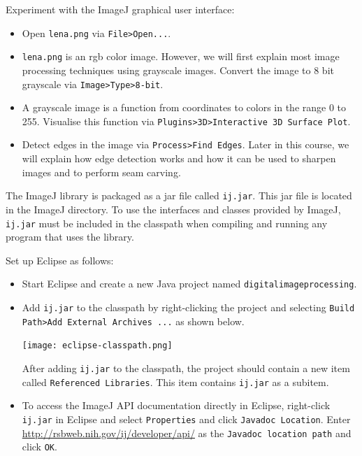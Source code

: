 \documentclass{book}
\begin{document}
\begin{exercise}
Experiment with the ImageJ graphical user interface:
\begin{itemize}
  \item Open \texttt{lena.png} via \texttt{File>Open...}.
  \item \texttt{lena.png} is an rgb color image. However, we will first explain most image processing techniques using grayscale images. Convert the image to 8 bit grayscale via \texttt{Image>Type>8-bit}.
  \item A grayscale image is a function from coordinates to colors in the range 0 to 255. Visualise this function via  \texttt{Plugins>3D>Interactive 3D Surface Plot}. 
  \item Detect edges in the image via \texttt{Process>Find Edges}. Later in this course, we will explain how edge detection works and how it can be used to sharpen images and to perform seam carving.
\end{itemize} 
\end{exercise}

The ImageJ library is packaged as a jar file called \texttt{ij.jar}. This jar file is located in the ImageJ directory. To use the interfaces and classes provided by ImageJ, \texttt{ij.jar} must be included in the classpath when compiling and running any program that uses the library. 

\begin{exercise}
Set up Eclipse as follows:
\begin{itemize}
  \item Start Eclipse and create a new Java project named \texttt{digitalimageprocessing}.
  \item Add \texttt{ij.jar} to the classpath by right-clicking the project and selecting \texttt{Build Path>Add External Archives ...} as shown below.
  \begin{center}
  \texttt{[image: eclipse-classpath.png]}
  \end{center}
  After adding \texttt{ij.jar} to the classpath, the project should contain a new item called \texttt{Referenced Libraries}. This item contains \texttt{ij.jar} as a subitem. 
  \item To access the ImageJ API documentation directly in Eclipse, right-click \texttt{ij.jar} in Eclipse and select \texttt{Properties} and click \texttt{Javadoc Location}. Enter \href{http://rsbweb.nih.gov/ij/developer/api/}{http://rsbweb.nih.gov/ij/developer/api/} as the \texttt{Javadoc location path} and click \texttt{OK}.  
\end{itemize}
\end{exercise}
\end{document}
